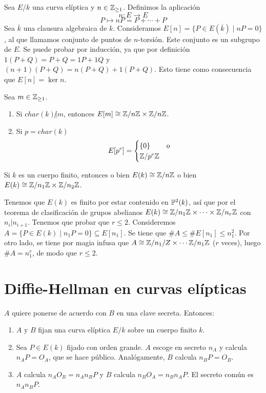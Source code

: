 \documentclass[CR.tex]{subfiles}
\begin{document}
Sea $E/k$ una curva elíptica y $n\in\mathbb{Z}_{\geq 1}$. Definimos la aplicación
\[
n:E\to E
\]
\[P\mapsto nP=P+\cdots+P\]
Sea $\overline{k}$ una clausura algebraica de $k$. Consideramos $E[n]=\{P\in E(\overline{k})\mid nP=0\}$, al que llamamos conjunto de puntos de $n$-torsión. Este conjunto es un subgrupo de $E$. Se puede probar por inducción, ya que por definición $1(P+Q)=P+Q=1P+1Q$ y $(n+1)(P+Q)=n(P+Q)+1(P+Q)$. Esto tiene como consecuencia que $E[n]=\ker n$. 

\begin{prop}
Sea $m\in\mathbb{Z}_{\geq 1}$. \begin{enumerate}
\item Si $char(k)\not| m$, entonces $E[m]\cong \mathbb{Z}/n\mathbb{Z}\times \mathbb{Z}/n\mathbb{Z}$. 
\item Si $p=char(k)$
\[
E[p^e]=\begin{cases}
\{0\} & o\\
\mathbb{Z}/p^e\mathbb{Z} & 
\end{cases}
\]
\end{enumerate} 
\end{prop}


\begin{prop}
Si $k$ es un cuerpo finito, entonces o bien $E(k)\cong \mathbb{Z}/n\mathbb{Z}$ o bien $E(k)\cong\mathbb{Z}/ n_1\mathbb{Z}\times \mathbb{Z}/n_2\mathbb{Z}$.
\end{prop}
\begin{dem}
Tenemos que $E(k)$ es finito por estar contenido en $\mathbb{P}^2(k)$, así que por el teorema de clasificación de grupos abelianos $E(k)\cong\mathbb{Z}/n_1\mathbb{Z}\times\cdots\times\mathbb{Z}/n_r\mathbb{Z}$ con $n_i|n_{i+1}$. Tenemos que probar que $r\leq 2$. Consideremos $A=\{P\in E(k)\mid n_1P=0\}\subseteq E[n_1]$. Se tiene que $\# A\leq \# E[n_1]\leq n_1^2$. Por otro lado, se tiene por magia infusa que $A\cong\mathbb{Z}/n_1/Z\times\cdots\mathbb{Z}/n_1\mathbb{Z}$ ($r$ veces), luego $\# A=n_1^r$, de modo que $r\leq 2$. 
\end{dem}

\section{Diffie-Hellman en curvas elípticas}
$A$ quiere ponerse de acuerdo con $B$ en una clave secreta. Entonces:
\begin{enumerate}
\item $A$ y $B$ fijan una curva elíptica $E/k$ sobre un cuerpo finito $k$. 
\item Sea $P\in E(k)$ fijado con orden grande. $A$ escoge en secreto $n_A$ y calcula $n_AP=O_A$, que se hace público. Analógamente, $B$ calcula $n_BP=O_B$. 
\item $A$ calcula $n_AO_B=n_An_BP$ y $B$ calcula $n_BO_A=n_Bn_AP$. El secreto común es $n_An_BP$. 
\end{enumerate}
\end{document}
